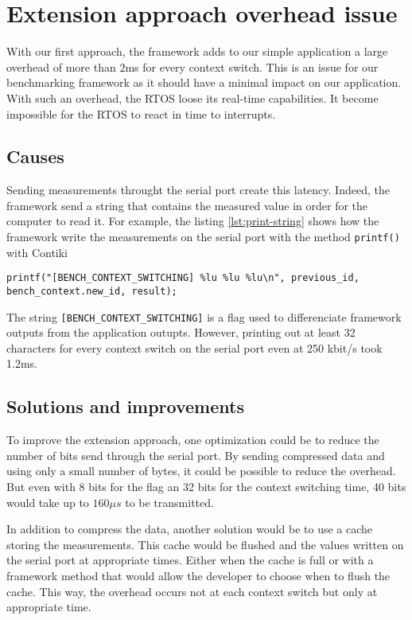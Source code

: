 \section{Extension approach overhead issue\label{sec:overhead}}

With our first approach, the framework adds to our simple application a large overhead of more than 2ms for every context switch.
This is an issue for our benchmarking framework as it should have a minimal impact on our application.
With such an overhead, the RTOS loose its real-time capabilities.
It become impossible for the RTOS to react in time to interrupts.

\subsection{Causes}

Sending measurements throught the serial port create this latency.
Indeed, the framework send a string that contains the measured value in order for the computer to read it.
For example, the listing \ref{lst:print-string} shows how the framework write the measurements on the serial port with the method \texttt{printf()} with Contiki

\begin{lstlisting}[style=CStyle, float, label={lst:print-string}, caption={writting the measurements to the serial port with Contiki}]
  printf("[BENCH_CONTEXT_SWITCHING] %lu %lu %lu\n", previous_id, bench_context.new_id, result);
\end{lstlisting}

The string \texttt{[BENCH\_CONTEXT\_SWITCHING]} is a flag used to differenciate framework outputs from the application outupts.
However, printing out at least 32 characters for every context switch on the serial port even at 250 kbit/s took 1.2ms.

\subsection{Solutions and improvements}

To improve the extension approach, one optimization could be to reduce the number of bits send through the serial port.
By sending compressed data and using only a small number of bytes, it could be possible to reduce the overhead.
But even with 8 bits for the flag an 32 bits for the context switching time, 40 bits would take up to $160\mu s$ to be transmitted.

In addition to compress the data, another solution would be to use a cache storing the measurements.
This cache would be flushed and the values written on the serial port at appropriate times.
Either when the cache is full or with a framework method that would allow the developer to choose when to flush the cache.
This way, the overhead occurs not at each context switch but only at appropriate time.


